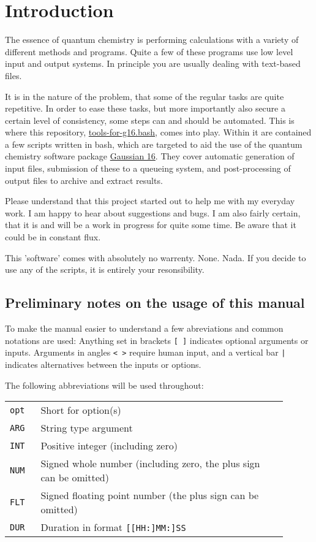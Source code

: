 \documentclass[   %
  final,          %
  a4paper         %
]{article}
\begin{document}
\section{Introduction}
\label{sec:introduction}

The essence of quantum chemistry is performing calculations with a variety of different methods and programs.
Quite a few of these programs use low level input and output systems.
In principle you are usually dealing with text-based files.

It is in the nature of the problem, 
that some of the regular tasks are quite repetitive.
In order to ease these tasks,
but more importantly also secure a certain level of consistency,
some steps can and should be automated.
This is where this repository, 
\href{https://github.com/polyluxus/tools-for-g16.bash}{tools-for-g16.bash},
comes into play.
Within it are contained a few scripts written in bash,
which are targeted to aid the use of the quantum chemistry software package 
\href{http://gaussian.com/}{Gaussian 16}.
They cover automatic generation of input files,
submission of these to a queueing system,
and post-processing of output files to archive and extract results.

Please understand that this project started out to help me with my everyday work. 
I am happy to hear about suggestions and bugs. 
I am also fairly certain, that it is and will be a work in progress for quite some time.
Be aware that it could be in constant flux. 

This 'software' comes with absolutely no warrenty. None. Nada.
If you decide to use any of the scripts, it is entirely your resonsibility.

\subsection{Preliminary notes on the usage of this manual}

To make the manual easier to understand a few abreviations 
and common notations are used:
Anything set in brackets \lstinline{[ ]} indicates optional arguments or inputs.
Arguments in angles \lstinline{< >} require human input, 
and a vertical bar \lstinline{|} indicates alternatives between the inputs or options.

The following abbreviations will be used throughout:

\begin{tabular}{p{0.1\linewidth}p{0.8\linewidth}}
  {\lstinline`opt`} & Short for option(s) \\
  {\lstinline`ARG`} & String type argument \\
  {\lstinline`INT`} & Positive integer (including zero) \\
  {\lstinline`NUM`} & Signed whole number (including zero, the plus sign can be omitted) \\
  {\lstinline`FLT`} & Signed floating point number (the plus sign can be omitted) \\
  {\lstinline`DUR`} & Duration in format {\lstinline![[HH:]MM:]SS!}  \\
\end{tabular}
\end{document}
